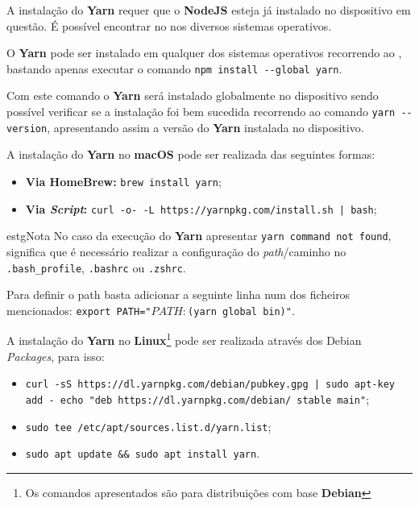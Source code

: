 \label{yarnAttachments}


A instalação do \textbf{Yarn} requer que o \textbf{NodeJS} esteja já instalado no dispositivo em questão. É possível encontrar no  nos diversos sistemas operativos.


O \textbf{Yarn} pode ser instalado em qualquer dos sistemas operativos recorrendo ao \textbf{}, bastando apenas executar o comando \verb|npm install --global yarn|.

Com este comando o \textbf{Yarn} será instalado globalmente no dispositivo sendo possível verificar se a instalação foi bem sucedida recorrendo ao comando \verb|yarn --version|, apresentando assim a versão do \textbf{Yarn} instalada no dispositivo.


A instalação do \textbf{Yarn} no \textbf{macOS} pode ser realizada das seguintes formas:

\begin{itemize}
	\item \textbf{Via HomeBrew:} \texttt{brew install yarn};
	\item \textbf{Via \textit{Script}:} \texttt{curl -o- -L https://yarnpkg.com/install.sh | bash};
\end{itemize}

\begin{mybox}{estg}{Nota}
	No caso da execução do \textbf{Yarn} apresentar \verb|yarn command not found|, significa que é necessário realizar a configuração do \textit{path}/caminho no \verb|.bash_profile|, \verb|.bashrc| ou \verb|.zshrc|.

	\vspace{5pt}

	Para definir o path basta adicionar a seguinte linha num dos ficheiros mencionados: \texttt{export PATH="$PATH:$(yarn global bin)"}.
\end{mybox}


A instalação do \textbf{Yarn} no \textbf{Linux}\footnote{Os comandos apresentados são para distribuições com base \textbf{Debian}} pode ser realizada através dos Debian \textit{Packages}, para isso:

\begin{itemize}
	\item \texttt{curl -sS https://dl.yarnpkg.com/debian/pubkey.gpg | sudo apt-key add -
echo "deb https://dl.yarnpkg.com/debian/ stable main"};
	\item \texttt{sudo tee /etc/apt/sources.list.d/yarn.list};
	\item \texttt{sudo apt update && sudo apt install yarn}.
\end{itemize}


